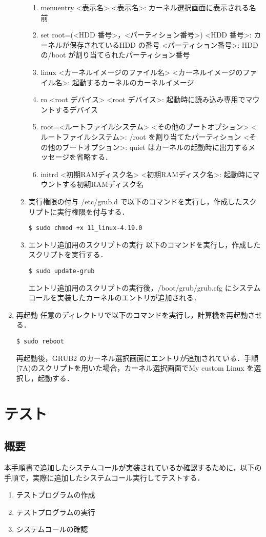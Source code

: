 \documentclass[12pt]{jsarticle}
\begin{document}
\begin{enumerate}
\begin{enumerate}
\begin{enumerate}
\item menuentry <表示名>
  <表示名>: カーネル選択画面に表示される名前
\item set root=(<HDD 番号>，<パーティション番号>)
  <HDD 番号>: カーネルが保存されているHDD の番号
  <パーティション番号>: HDD の/boot が割り当てられたパーティション番号
\item linux <カーネルイメージのファイル名>
  <カーネルイメージのファイル名>: 起動するカーネルのカーネルイメージ
\item ro <root デバイス>
  <root デバイス>: 起動時に読み込み専用でマウントするデバイス
\item root=<ルートファイルシステム> <その他のブートオプション>
  <ルートファイルシステム>: /root を割り当てたパーティション
  <その他のブートオプション>: quiet はカーネルの起動時に出力するメッセージを省略する．
\item initrd <初期RAMディスク名>
  <初期RAMディスク名>: 起動時にマウントする初期RAMディスク名
\end{enumerate}

\item 実行権限の付与
  /etc/grub.d で以下のコマンドを実行し，作成したスクリプトに実行権限を付与する．
\begin{verbatim}
$ sudo chmod +x 11_linux-4.19.0
\end{verbatim}
\item エントリ追加用のスクリプトの実行
  以下のコマンドを実行し，作成したスクリプトを実行する．
\begin{verbatim}
$ sudo update-grub
\end{verbatim}
エントリ追加用のスクリプトの実行後，/boot/grub/grub.cfg にシステムコールを実装したカーネルのエントリが追加される．
\end{enumerate}
\item 再起動
  任意のディレクトリで以下のコマンドを実行し，計算機を再起動させる．
\begin{verbatim}
$ sudo reboot
\end{verbatim}
再起動後，GRUB2 のカーネル選択画面にエントリが追加されている．手順(7A)のスクリプトを用いた場合，カーネル選択画面でMy custom Linux を選択し，起動する．
  \end{enumerate}
\section{テスト}\label{sec:test}
 \subsection{概要}
 本手順書で追加したシステムコールが実装されているか確認するために，以下の手順で，実際に追加したシステムコール実行してテストする．
\begin{enumerate}
 \item テストプログラムの作成
 \item テストプログラムの実行
 \item システムコールの確認
\end{enumerate}
\end{document}
